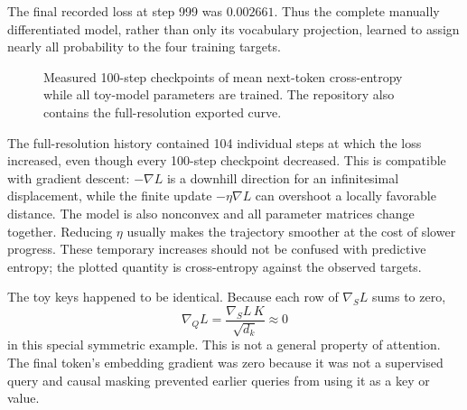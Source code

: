 \documentclass[11pt]{article}
\newcommand{\grad}{\nabla}
\begin{document}
The final recorded loss at step 999 was $0.002661$. Thus the complete manually differentiated model,
rather than only its vocabulary projection, learned to assign nearly all probability to the four training
targets.

\begin{figure}[ht]
\centering
{}
\caption{Measured 100-step checkpoints of mean next-token cross-entropy while all toy-model parameters are trained. The repository also contains the full-resolution exported curve.}
\label{fig:learningcurve}
\end{figure}

The full-resolution history contained 104 individual steps at which the loss increased, even though every
100-step checkpoint decreased. This is compatible with gradient descent: $-\grad L$ is a downhill direction
for an infinitesimal displacement, while the finite update $-\eta\grad L$ can overshoot a locally favorable
distance. The model is also nonconvex and all parameter matrices change together. Reducing $\eta$ usually
makes the trajectory smoother at the cost of slower progress. These temporary increases should not be
confused with predictive entropy; the plotted quantity is cross-entropy against the observed targets.

The toy keys happened to be identical. Because each row of $\grad_S L$ sums to zero,
\[
  \grad_Q L=\frac{\grad_S L\,K}{\sqrt{d_k}}\approx0
\]
in this special symmetric example. This is not a general property of attention. The final token's embedding
gradient was zero because it was not a supervised query and causal masking prevented earlier queries from
using it as a key or value.
\end{document}
